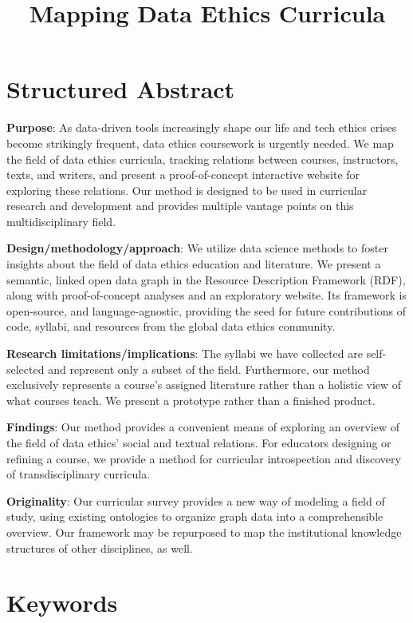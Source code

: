 \documentclass[
]{article}
\title{Mapping Data Ethics Curricula}
\author{}
\date{}
\begin{document}
\maketitle

\hypertarget{structured-abstract}{%
\section{Structured Abstract}\label{structured-abstract}}

\textbf{Purpose}: As data-driven tools increasingly shape our life and
tech ethics crises become strikingly frequent, data ethics coursework is
urgently needed. We map the field of data ethics curricula, tracking
relations between courses, instructors, texts, and writers, and present
a proof-of-concept interactive website for exploring these relations.
Our method is designed to be used in curricular research and development
and provides multiple vantage points on this multidisciplinary field.

\textbf{Design/methodology/approach}: We utilize data science methods to
foster insights about the field of data ethics education and literature.
We present a semantic, linked open data graph in the Resource
Description Framework (RDF), along with proof-of-concept analyses and an
exploratory website. Its framework is open-source, and
language-agnostic, providing the seed for future contributions of code,
syllabi, and resources from the global data ethics community.

\textbf{Research limitations/implications}: The syllabi we have
collected are self-selected and represent only a subset of the field.
Furthermore, our method exclusively represents a course's assigned
literature rather than a holistic view of what courses teach. We present
a prototype rather than a finished product.

\textbf{Findings}: Our method provides a convenient means of exploring
an overview of the field of data ethics' social and textual relations.
For educators designing or refining a course, we provide a method for
curricular introspection and discovery of transdisciplinary curricula.

\textbf{Originality}: Our curricular survey provides a new way of
modeling a field of study, using existing ontologies to organize graph
data into a comprehensible overview. Our framework may be repurposed to
map the institutional knowledge structures of other disciplines, as
well.

\hypertarget{keywords}{%
\section{Keywords}\label{keywords}}
\end{document}
